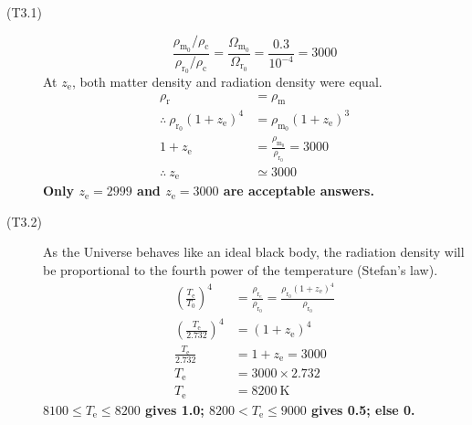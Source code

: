 \begin{description}
\item[(T3.1)]
\[
\frac{\rho_{\mathrm{m_0}}/\rho_{\mathrm{c}}}{\rho_{\mathrm{r_0}}/\rho_{\mathrm{c}}}
= \frac{\Omega_{\mathrm{m_0}}}{\Omega_{\mathrm{r_0}}}
= \frac{0.3}{10^{-4}} = 3000
\]
At $z_{\mathrm{e}}$, both matter density and radiation density were equal.
\begin{align*}
\rho_{\mathrm{r}} &= \rho_{\mathrm{m}}\\
\therefore\ \rho_{\mathrm{r_0}}(1+z_{\mathrm{e}})^4
  &= \rho_{\mathrm{m_0}}(1+z_{\mathrm{e}})^3\\
1+z_{\mathrm{e}} &= \frac{\rho_{\mathrm{m_0}}}{\rho_{\mathrm{r_0}}} = 3000
  \tag*{(2.0)}\\
\therefore\ z_{\mathrm{e}} &\simeq 3000 \tag*{(1.0)}
\end{align*}
\textbf{Only $z_{\mathrm{e}} = 2999$ and $z_{\mathrm{e}} = 3000$ are
acceptable answers.}

\item[(T3.2)] As the Universe behaves like an ideal black body, the radiation
density will be proportional to the fourth power of the temperature (Stefan's
law).
\begin{align*}
\left(\frac{T_{\mathrm{e}}}{T_0}\right)^4
  &= \frac{\rho_{\mathrm{r_e}}}{\rho_{\mathrm{r_0}}}
   = \frac{\rho_{\mathrm{r_0}}(1+z_{\mathrm{e}})^4}{\rho_{\mathrm{r_0}}}
  \tag*{(2.0)}\\
\left(\frac{T_{\mathrm{e}}}{2.732}\right)^4
  &= (1+z_{\mathrm{e}})^4 \tag*{(1.0)}\\
\frac{T_{\mathrm{e}}}{2.732} &= 1+z_{\mathrm{e}} = 3000\\
T_{\mathrm{e}} &= 3000\times2.732\\
T_{\mathrm{e}} &= 8200\ \mathrm{K} \tag*{(1.0)}
\end{align*}
\textbf{$8100 \le T_{\mathrm{e}} \le 8200$ gives 1.0;
$8200 < T_{\mathrm{e}} \le 9000$ gives 0.5; else 0.}


\end{description}
